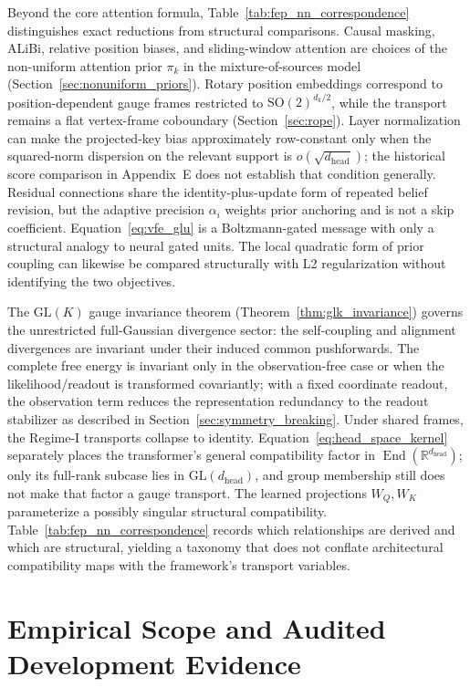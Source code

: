 \documentclass[twoside,11pt]{article}
\begin{document}
Beyond the core attention formula, Table~\ref{tab:fep_nn_correspondence} distinguishes exact reductions from structural comparisons. Causal masking, ALiBi, relative position biases, and sliding-window attention are choices of the non-uniform attention prior $\pi_k$ in the mixture-of-sources model (Section~\ref{sec:nonuniform_priors}). Rotary position embeddings correspond to position-dependent gauge frames restricted to $\mathrm{SO}(2)^{d_k/2}$, while the transport remains a flat vertex-frame coboundary (Section~\ref{sec:rope}). Layer normalization can make the projected-key bias approximately row-constant only when the squared-norm dispersion on the relevant support is $o(\sqrt{d_{\mathrm{head}}})$; the historical score comparison in Appendix~E does not establish that condition generally. Residual connections share the identity-plus-update form of repeated belief revision, but the adaptive precision $\alpha_i$ weights prior anchoring and is not a skip coefficient. Equation~\eqref{eq:vfe_glu} is a Boltzmann-gated message with only a structural analogy to neural gated units. The local quadratic form of prior coupling can likewise be compared structurally with L2 regularization without identifying the two objectives.

The $\mathrm{GL}(K)$ gauge invariance theorem (Theorem~\ref{thm:glk_invariance}) governs the unrestricted full-Gaussian divergence sector: the self-coupling and alignment divergences are invariant under their induced common pushforwards. The complete free energy is invariant only in the observation-free case or when the likelihood/readout is transformed covariantly; with a fixed coordinate readout, the observation term reduces the representation redundancy to the readout stabilizer as described in Section~\ref{sec:symmetry_breaking}. Under shared frames, the Regime-I transports collapse to identity. Equation~\eqref{eq:head_space_kernel} separately places the transformer's general compatibility factor in $\operatorname{End}(\mathbb{R}^{d_{\text{head}}})$; only its full-rank subcase lies in $\mathrm{GL}(d_{\text{head}})$, and group membership still does not make that factor a gauge transport. The learned projections $W_Q, W_K$ parameterize a possibly singular structural compatibility. Table~\ref{tab:fep_nn_correspondence} records which relationships are derived and which are structural, yielding a taxonomy that does not conflate architectural compatibility maps with the framework's transport variables.


\section{Empirical Scope and Audited Development Evidence}
\end{document}

